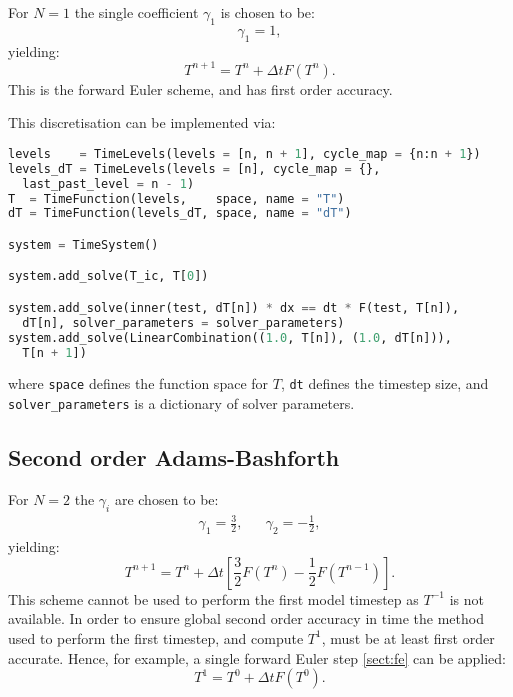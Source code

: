 \documentclass[a4paper]{book}
\begin{document}
For $N = 1$ the single coefficient $\gamma_1$ is chosen to be:
\begin{equation}
  \gamma_1 = 1,
\end{equation}
yielding:
\begin{equation}
  T^{n + 1} = T^n + \Delta t F(T^n).
\end{equation}
This is the forward Euler scheme, and has first order accuracy.

This discretisation can be implemented via:
\begin{lstlisting}[language = python, frame = single, basicstyle=\footnotesize]
levels    = TimeLevels(levels = [n, n + 1], cycle_map = {n:n + 1})
levels_dT = TimeLevels(levels = [n], cycle_map = {},
  last_past_level = n - 1)
T  = TimeFunction(levels,    space, name = "T")
dT = TimeFunction(levels_dT, space, name = "dT")

system = TimeSystem()

system.add_solve(T_ic, T[0])

system.add_solve(inner(test, dT[n]) * dx == dt * F(test, T[n]),
  dT[n], solver_parameters = solver_parameters)
system.add_solve(LinearCombination((1.0, T[n]), (1.0, dT[n])),
  T[n + 1])
\end{lstlisting}
where \verb+space+ defines the function space for $T$, \verb+dt+ defines the
timestep size, and \verb+solver_parameters+ is a dictionary of solver
parameters.

\subsection{Second order Adams-Bashforth}\label{sect:ab2}

For $N = 2$ the $\gamma_i$ are chosen to be:
\begin{align}
  \gamma_1 = \frac{3}{2}, & & \gamma_2 = -\frac{1}{2},
\end{align}
yielding:
\begin{equation}
  T^{n + 1} = T^n + \Delta t \left[ \frac{3}{2} F(T^n) - \frac{1}{2} F(T^{n - 1}) \right].
\end{equation}
This scheme cannot be used to perform the first model timestep as $T^{-1}$ is
not available. In order to ensure global second order accuracy in time the
method used to perform the first timestep, and compute $T^1$, must be at least
first order accurate. Hence, for example, a single forward Euler step
\ref{sect:fe} can be applied:
\begin{equation}
  T^1 = T^0 + \Delta t F(T^0).
\end{equation}
\end{document}
